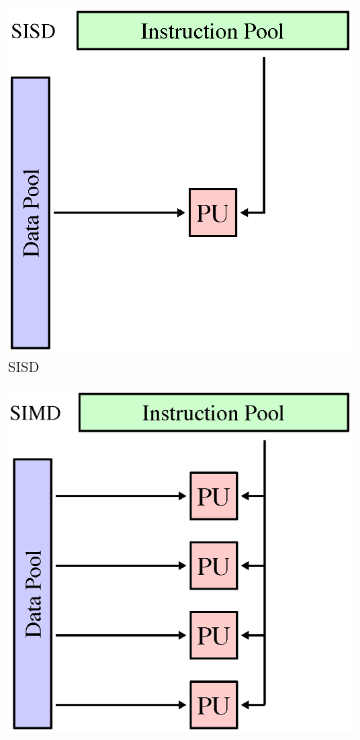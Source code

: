 \begin{figure}
\begin{fullwidth}
	\begin{subfigure}[b]{0.245\thewidth}
		\includegraphics[width=1.\textwidth]{figures/rp/SISD}
		\caption{SISD}
	\end{subfigure}
	\begin{subfigure}[b]{0.245\thewidth}
		\includegraphics[width=1.\textwidth]{figures/rp/SIMD}

\end{subfigure}
\end{fullwidth}
\end{figure}
